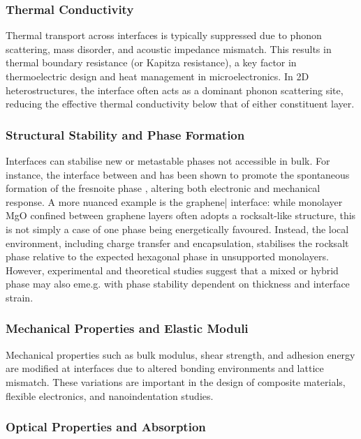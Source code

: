 \subsubsection{Thermal Conductivity} 
 
Thermal transport across interfaces is typically suppressed due to phonon scattering, mass disorder, and acoustic impedance mismatch. This results in thermal boundary resistance (or Kapitza resistance), a key factor in thermoelectric design and heat management in microelectronics. In 2D heterostructures, the interface often acts as a dominant phonon scattering site, reducing the effective thermal conductivity below that of either constituent layer. 
 
\subsubsection{Structural Stability and Phase Formation} 
 
Interfaces can stabilise new or metastable phases not accessible in bulk. For instance, the interface between  and  has been shown to promote the spontaneous formation of the fresnoite phase , altering both electronic and mechanical response. A more nuanced example is the graphene| interface: while monolayer MgO confined between graphene layers often adopts a rocksalt-like structure, this is not simply a case of one phase being energetically favoured. Instead, the local environment, including charge transfer and encapsulation, stabilises the rocksalt phase relative to the expected hexagonal phase in unsupported monolayers. However, experimental and theoretical studies suggest that a mixed or hybrid phase may also eme.g. with phase stability dependent on thickness and interface strain. 
 
\subsubsection{Mechanical Properties and Elastic Moduli} 
 
Mechanical properties such as bulk modulus, shear strength, and adhesion energy are modified at interfaces due to altered bonding environments and lattice mismatch. These variations are important in the design of composite materials, flexible electronics, and nanoindentation studies. 
 
\subsubsection{Optical Properties and Absorption} 
 
